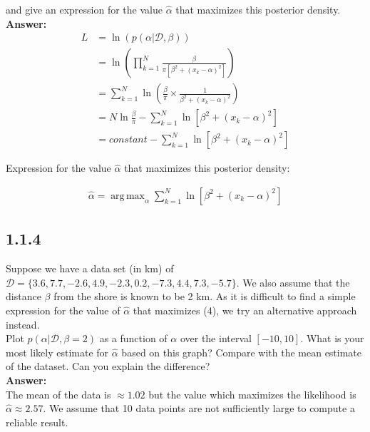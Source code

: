 \documentclass[a4paper]{article}
\DeclareMathOperator*{\argmax}{arg\,max}
\begin{document}
and give an expression for the value $\hat{\alpha}$ that maximizes this posterior density.\\

\textbf{Answer:}\\

\begin{align*}
L &= \ln(p(\alpha|\mathcal{D}, \beta))\\
&= \ln(\prod_{k=1}^N \frac{\beta}{\pi [\beta^2 + (x_k - \alpha)^2]})\\
&= \sum_{k=1}^N \ln (\frac{\beta}{\pi} \times \frac{1}{\beta^2 + (x_k - \alpha)^2})\\
&= N \ln \frac{\beta}{\pi} - \sum_{k=1}^N \ln [\beta^2 + (x_k - \alpha)^2]\\
&= constant - \sum_{k = 1}^N \ln [\beta^2 + (x_k - \alpha)^2]
\end{align*}

Expression for the value $\hat{\alpha}$ that maximizes this posterior density:

\begin{align*}
\hat{\alpha} = \argmax_\alpha \sum_{k = 1}^N \ln [\beta^2 + (x_k - \alpha)^2]
\end{align*}

\subsection*{1.1.4}

Suppose we have a data set (in km) of $\mathcal{D} = \{ 3.6, 7.7, -2.6, 4.9, -2.3, 0.2, -7.3, 4.4, 7.3, -5.7\}$. We also assume that the distance $\beta$ from the shore is known to be 2 km. As it is difficult to find a simple expression for the value of $\hat{\alpha}$ that maximizes (4), we try an alternative approach instead.\\

Plot $p(\alpha|\mathcal{D}, \beta = 2)$ as a function of $\alpha$ over the interval $[-10, 10]$. What is your most likely estimate for $\hat{\alpha}$ based on this graph? Compare with the mean estimate of the dataset. Can you explain the difference?\\


\textbf{Answer:}\\

The mean of the data is $ \approx 1.02$ but the value which maximizes the likelihood is $\hat{\alpha}\approx 2.57$. We assume that 10 data points are not sufficiently large to compute a reliable result.
\end{document}
